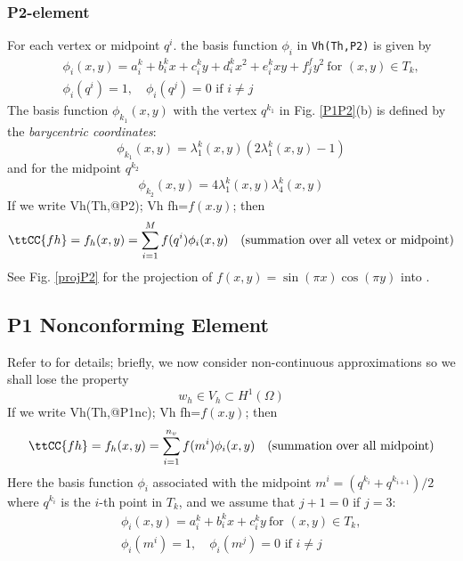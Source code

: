 \documentclass[a4paper,twoside,12pt]{book}
\begin{document}
\subsubsection{P2-element}
For each vertex or midpoint $q^i$. the basis function $\phi_i$ in \texttt{Vh(Th,P2)}
is given by
\begin{eqnarray*}
&&\phi_i(x,y)=a^k_i+b^k_ix+c^k_iy+d^k_ix^2+e^k_ixy+f^f_jy^2~\textrm{for }(x,y)\in T_k,\\
&&\phi_i(q^i)=1,\quad \phi_i(q^j)=0\textrm{ if }i\neq j
\end{eqnarray*}
The basis function $\phi_{k_1}(x,y)$ with the vertex $q^{k_1}$ in
Fig. \ref{P1P2}(b) is defined by the \emph{barycentric coordinates}:
$$
\phi_{k_1}(x,y) = \lambda^k_{1}(x,y)(2\lambda^k_1(x,y)-1)
$$
and for the midpoint $q^{k_2}$
$$
\phi_{k_2}(x,y) = 4\lambda^k_1(x,y)\lambda^k_4(x,y)
$$
If we write
\bFF
Vh(Th,@P2); Vh fh=$f(x.y)$;
\eFF
then
$$
\ttCC{fh}=f_h(x,y)=\sum_{i=1}^{M}f(q^i)\phi_i(x,y)\quad (\textrm{summation over all vetex or midpoint})
$$
See Fig. \ref{projP2} for the projection of $f(x,y)=\sin(\pi x)\cos(\pi y)$
into .


\subsection{P1 Nonconforming Element}
Refer to \cite{Thomasset} for details; briefly, we now consider non-continuous approximations
so we shall lose the property
$$
w_h\in V_h\subset H^1(\Omega)
$$
If we write
\bFF
Vh(Th,@P1nc); Vh fh=$f(x.y)$;
\eFF
then
$$
\ttCC{fh}=f_h(x,y)=\sum_{i=1}^{n_v}f(m^i)\phi_i(x,y)\quad (\textrm{summation over all midpoint})
$$
Here the basis function $\phi_i$ associated with the midpoint
$m^i=(q^{k_i}+q^{k_{i+1}})/2$ where $q^{k_i}$ is the $i$-th point in $T_k$,
and we assume that $j+1=0$ if $j=3$:
\begin{eqnarray*}
&&\phi_i(x,y)=a^k_i+b^k_ix+c^k_iy~\textrm{for }(x,y)\in T_k,\\
&&\phi_i(m^i)=1,\quad \phi_i(m^j)=0\textrm{ if }i\neq j
\end{eqnarray*}
\end{document}
